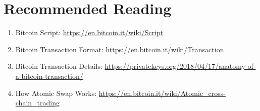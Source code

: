 \documentclass[11pt]{article}
\begin{document}
\section{Recommended Reading}
\begin{enumerate}
  \item Bitcoin Script:
  \href{https://en.bitcoin.it/wiki/Script}{https://en.bitcoin.it/wiki/Script}
  \item Bitcoin Transaction Format:
  \href{https://en.bitcoin.it/wiki/Transaction}{https://en.bitcoin.it/wiki/Transaction}
  \item Bitcoin Transaction Details:
  \href{https://privatekeys.org/2018/04/17/anatomy-of-a-bitcoin-transaction/}{https://privatekeys.org/2018/04/17/anatomy-of-a-bitcoin-transaction/}
  \item How Atomic Swap Works: \href{https://en.bitcoin.it/wiki/Atomic\_cross-chain\_trading}{https://en.bitcoin.it/wiki/Atomic\_cross-chain\_trading}
\end{enumerate}
\end{document}
